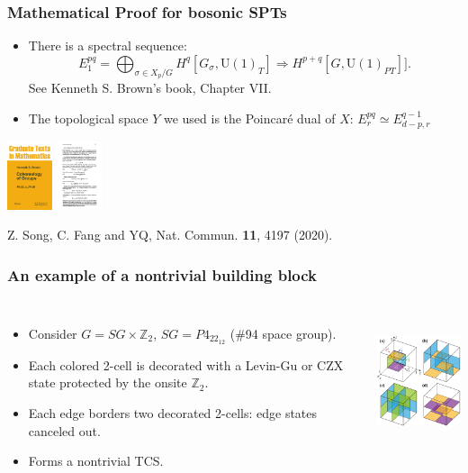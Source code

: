 \documentclass[xcolor=table, 11pt, aspectratio=169]{beamer}
\newcommand{\uone}{\mathrm U(1)}
\begin{document}
\begin{frame}
\frametitle{Mathematical Proof for bosonic SPTs}
\begin{itemize}
\item There is a spectral sequence:
\[E_1^{pq}=\bigoplus_{\sigma\in X_p/G}H^q[G_\sigma,\uone_T]\Rightarrow
 H^{p+q}[G, \uone_{PT}]].\]
See Kenneth S. Brown's book, Chapter VII.
\item The topological space $Y$ we used is the Poincar\'e dual of $X$: $E^{pq}_r\simeq E^{q-1}_{d-p,r}$ 
\end{itemize}
\begin{center}
	\includegraphics[height=2cm]{brown_book}
	\includegraphics[height=2cm]{brown_ss}
\end{center}
{\small Z. Song, C. Fang and YQ, Nat. Commun. \textbf{11}, 4197 (2020).}
\end{frame}

\begin{frame}
  \frametitle{An example of a nontrivial building block}
  \begin{columns}
    \begin{itemize}
      \item<1-> Consider $G=SG\times\mathbb Z_2$, $SG=P4_22_12$ (\#94 space group).
      \item<2-> Each colored 2-cell is decorated with a Levin-Gu or CZX state protected by the onsite $\mathbb Z_2$.
      \item<3-> Each edge borders two decorated 2-cells: edge states canceled out.
      \item<4-> Forms a nontrivial TCS.
    \end{itemize}
    \includegraphics[height=4cm]{blocks}
    \end{columns}
  \end{frame}
  
\end{document}

